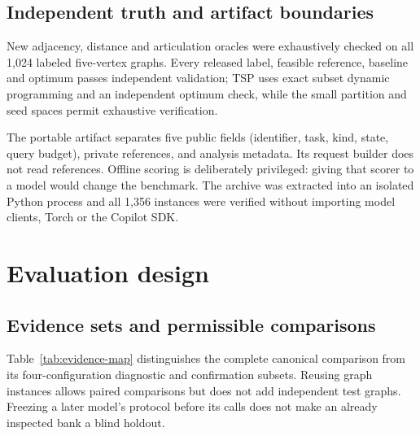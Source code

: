\subsection{Independent truth and artifact boundaries}
New adjacency, distance and articulation oracles were exhaustively checked
on all 1,024 labeled five-vertex graphs. Every released label, feasible
reference, baseline and optimum passes independent validation; TSP uses exact
subset dynamic programming and an independent optimum check, while the small
partition and seed spaces permit exhaustive verification.

The portable artifact separates five public fields (identifier, task, kind,
state, query budget), private references, and analysis metadata. Its request
builder does not read references. Offline scoring is deliberately privileged:
giving that scorer to a model would change the benchmark. The archive was
extracted into an isolated Python process and all 1,356 instances were
verified without importing model clients, Torch or the Copilot SDK.

\section{Evaluation design}
\label{app:method-details}
\subsection{Evidence sets and permissible comparisons}
Table~\ref{tab:evidence-map} distinguishes the complete canonical comparison
from its four-configuration diagnostic and confirmation subsets.
Reusing graph instances allows paired comparisons
but does not add independent test graphs. Freezing a later model's protocol
before its calls does not make an already inspected bank a blind holdout.

